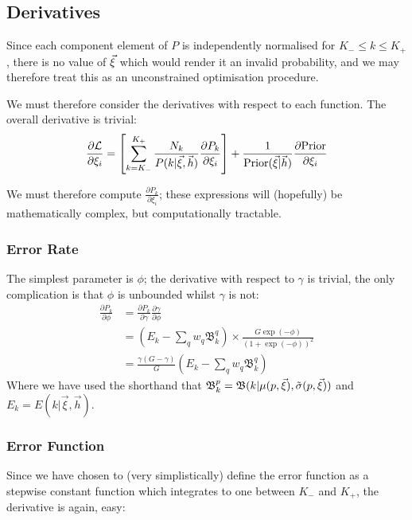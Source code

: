 \documentclass[fleqn,usenatbib]{acmart}
\newcommand{\pdiv}[2]{\frac{\partial #1}{\partial #2}}
\begin{document}
		\subsection{Derivatives}
		Since each component element of $P$ is independently normalised for $K_- \leq k \leq K_+$, there is no value of $\vec{\xi}$ which would render it an invalid probability, and we may therefore treat this as an unconstrained optimisation procedure.

		We must therefore consider the derivatives with respect to each function. The overall derivative is trivial:
		\begin{equation}
			\pdiv{\mathcal{L}}{\xi_i} = \left[\sum_{k=K_-}^{K_+} \frac{N_k}{P(k|\vxi,\vec{h})} \pdiv{P_k}{\xi_i} \right] + \frac{1}{\text{Prior}(\vxi|\vec{h})} \pdiv{\text{Prior}}{\xi_i}
		\end{equation}
		
		We must therefore compute $ \pdiv{P_k}{\xi_i}$; these expressions will (hopefully) be mathematically complex, but computationally tractable. 


		\subsubsection{Error Rate} 

			The simplest parameter is $\phi$; the derivative with respect to $\gamma$ is trivial, the only complication is that $\phi$ is unbounded whilst $\gamma$ is not:
			\begin{align}
				\pdiv{P_k}{\phi} & = \pdiv{P_k}{\gamma} \pdiv{\gamma}{\phi} 
				\\
				& = \left(E_k - \sum_q w_q \mathfrak{B}_k^q \right) \times \frac{G \exp(-\phi)}{(1 + \exp(-\phi))^2}
				\\
				& = \frac{\gamma(G-\gamma)}{G}\left(E_k - \sum_q w_q \mathfrak{B}_k^q \right)
			\end{align}
			Where we have used the shorthand that $\mathfrak{B}_k^p = \mathfrak{B}(k|\mu(p,\vec{\xi}),\tilde\sigma(p,\vec{\xi}))$ and $E_k = E(k|\vec{\xi},\vec{h})$.
		
		\subsubsection{Error Function}

			Since we have chosen to (very simplistically) define the error function as a stepwise constant function which integrates to one between $K_-$ and $K_+$, the derivative is again, easy:
\end{document}
